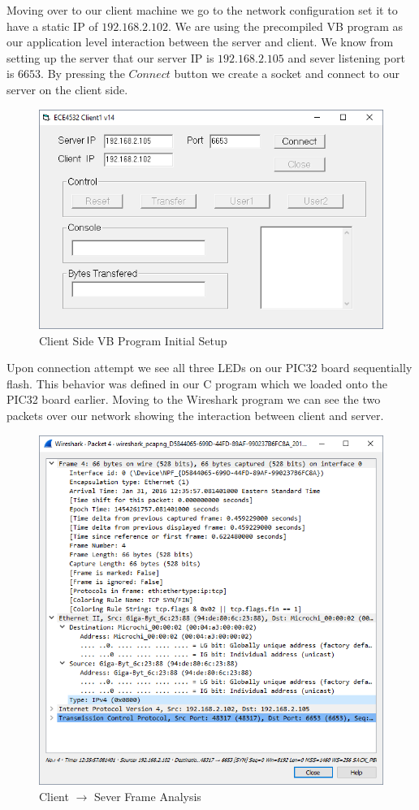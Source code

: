 \documentclass[12pt]{article}
\begin{document}
Moving over to our client machine we go to the network configuration set it 
to have a static IP of $192.168.2.102$. We are using the precompiled VB 
program as our application level interaction between the server and client. 
We know from setting up the server that our server IP is $192.168.2.105$ 
and sever listening port is $6653$. By pressing the $Connect$ button we 
create a socket and connect to our server on the client side. 

\begin{figure}[H]
    \centering
    \includegraphics[width=4.5in]{vb_client_intial_setup.png}
    \caption{Client Side VB Program Initial Setup}
\end{figure}

Upon connection attempt we see all three LEDs on our PIC32 board 
sequentially flash. This behavior was defined in our C program which we 
loaded onto the PIC32 board earlier. Moving to the Wireshark program we 
can see the two packets over our network showing the interaction between 
client and server. 

\begin{figure}[H]
    \centering
    \includegraphics[width=4.5in]{client_server_frame_analysis.png}
    \caption{Client $\rightarrow$ Sever Frame Analysis}
\end{figure}
\end{document}

